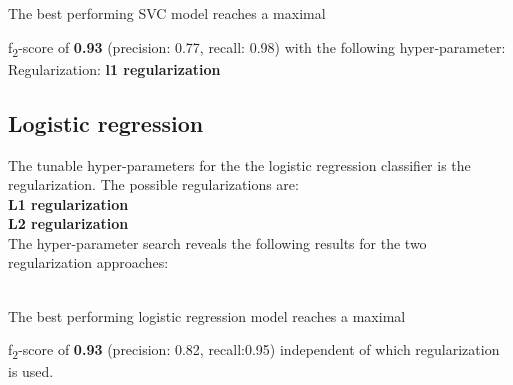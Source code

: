The best performing SVC model reaches a maximal {f\textsubscript{2}-score of \textbf{0.93} (precision:  0.77, recall: 0.98) with the following hyper-parameter:\\
Regularization: \qquad  \qquad \textbf{l1 regularization}

\subsection*{Logistic regression}
The tunable hyper-parameters for the the logistic regression classifier is the regularization. The possible regularizations are:
\\
\textbf{L1 regularization}\\
\textbf{L2 regularization}  \\

The hyper-parameter search reveals the following results for the two regularization approaches: \\

\pgfplotsset{width=1.1\textwidth, height=0.5\textwidth}

\\


The best performing logistic regression model reaches a maximal {f\textsubscript{2}-score of \textbf{0.93} (precision:  0.82, recall:0.95) independent of which regularization is used.

}}
